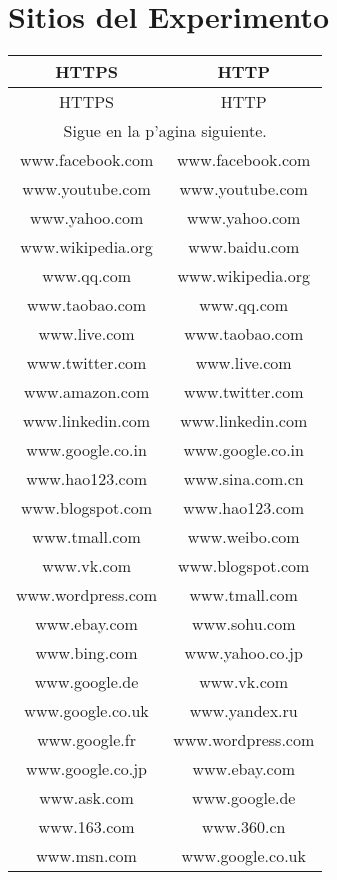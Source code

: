 \chapter{Sitios del Experimento}
\label{sitiosAlexa}
\begin{longtable}{c c}
\hline
HTTPS & HTTP \\
\hline \hline
\endfirsthead

\hline
HTTPS & HTTP \\
\hline \hline
\endhead

\multicolumn{2}{c}{Sigue en la p'agina siguiente.}
\endfoot

\endlastfoot

\hline
www.google.com & www.google.com \\
www.facebook.com & www.facebook.com \\
www.youtube.com & www.youtube.com \\
www.yahoo.com & www.yahoo.com \\
www.wikipedia.org & www.baidu.com \\
www.qq.com & www.wikipedia.org \\
www.taobao.com & www.qq.com \\
www.live.com & www.taobao.com \\
www.twitter.com & www.live.com \\
www.amazon.com & www.twitter.com \\
www.linkedin.com & www.linkedin.com \\
www.google.co.in & www.google.co.in \\
www.hao123.com & www.sina.com.cn \\
www.blogspot.com & www.hao123.com \\
www.tmall.com & www.weibo.com \\
www.vk.com & www.blogspot.com \\
www.wordpress.com & www.tmall.com \\
www.ebay.com & www.sohu.com \\
www.bing.com & www.yahoo.co.jp \\
www.google.de & www.vk.com \\
www.google.co.uk & www.yandex.ru \\
www.google.fr & www.wordpress.com \\
www.google.co.jp & www.ebay.com \\
www.ask.com & www.google.de \\
www.163.com & www.360.cn \\
www.msn.com & www.google.co.uk \\

\end{longtable}
